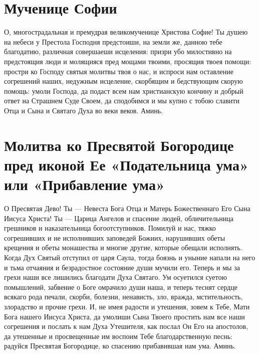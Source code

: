 
 

\section{Мученице Софии}
 


О, многострадальная и премудрая великомученице Христова Софие! Ты душею на небеси у Престола Господня предстоиши, на земли же, данною тебе благодатию, различная совершаеши исцеления: призри убо милостивно на предстоящия люди и молящияся пред мощами твоими, просящия твоея помощи: простри ко Господу святыя молитвы твоя о нас, и испроси нам оставление согрешений наших, недужным исцеление, скорбящим и бедствующим скорую помощь: умоли Господа, да подаст всем нам христианскую кончину и добрый ответ на Страшнем Суде Своем, да сподобимся и мы купно с тобою славити Отца и Сына и Святаго Духа во веки веков. Аминь.



 

\section{Молитва ко Пресвятой Богородице пред иконой Ее «Подательница ума» или «Прибавление ума»}
 


О Пресвятая Дево! Ты — Невеста Бога Отца и Матерь Божественнаго Его Сына Иисуса Христа! Ты — Царица Ангелов и спасение людей, обличительница грешников и наказательница богоотступников. Помилуй и нас, тяжко согрешивших и не исполнивших заповедей Божиих, нарушивших обеты крещения и обеты монашества и многие другие, которые обещали исполнять. Когда Дух Святый отступил от царя Саула, тогда боязнь и уныние напали на него и тьма отчаяния и безрадостное состояние души мучили его. Теперь и мы за грехи наши все лишились благодати Духа Святаго. Ум осуетился суетою помышлений, забвение о Боге омрачило души наша, и теперь теснят сердце всякаго рода печали, скорби, болезни, ненависть, зло, вражда, мстительность, злорадство и прочие грехи. И, не имея радости и утешения, зовем к Тебе, Мати Бога нашего Иисуса Христа, да умолиши Сына Твоего простить нам все наши согрешения и послать к нам Духа Утешителя, как послал Он Его на апостолов, да утешенные и просвещенные им воспоим Тебе благодарственную песнь: радуйся Пресвятая Богородице, ко спасению прибавившая нам ума. Аминь.


